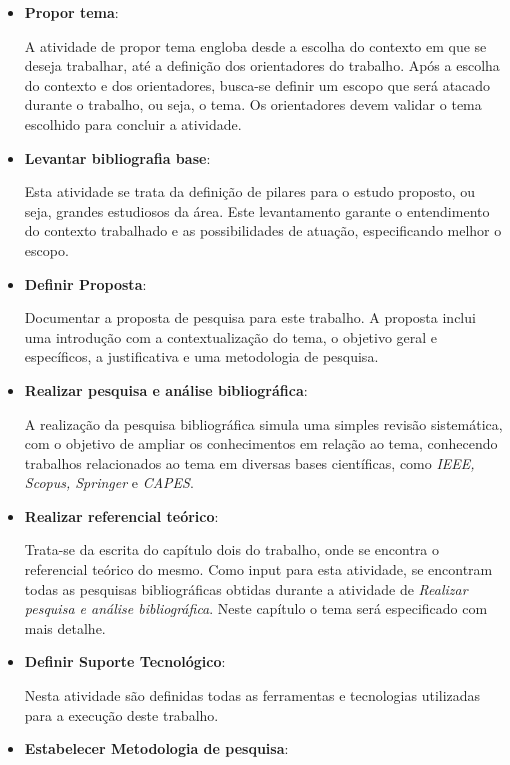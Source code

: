 \begin{itemize}
	\item \textbf{Propor tema}:

		A atividade de propor tema engloba desde a escolha do contexto em que se deseja trabalhar, até a definição dos orientadores do trabalho. Após a escolha do contexto e dos orientadores, busca-se definir um escopo que será atacado durante o trabalho, ou seja, o tema. Os orientadores devem validar o tema escolhido para concluir a atividade.

	\item \textbf{Levantar bibliografia base}:

		Esta atividade se trata da definição de pilares para o estudo proposto, ou seja, grandes estudiosos da área. Este levantamento garante o entendimento do contexto trabalhado e as possibilidades de atuação, especificando melhor o escopo.

	\item \textbf{Definir Proposta}:

		Documentar a proposta de pesquisa para este trabalho. A proposta inclui uma introdução com a contextualização do tema, o objetivo geral e específicos, a justificativa e uma metodologia de pesquisa.

	\item \textbf{Realizar pesquisa e análise bibliográfica}:

		A realização da pesquisa bibliográfica simula uma simples revisão sistemática, com o objetivo de ampliar os conhecimentos em relação ao tema, conhecendo trabalhos relacionados ao tema em diversas bases científicas, como \textit{IEEE, Scopus, Springer} e \textit{CAPES}.

	\item \textbf{Realizar referencial teórico}:

		Trata-se da escrita do capítulo dois do trabalho, onde se encontra o referencial teórico do mesmo. Como input para esta atividade, se encontram todas as pesquisas bibliográficas obtidas durante a atividade de \textit{Realizar pesquisa e análise bibliográfica}. Neste capítulo o tema será especificado com mais detalhe.

	\item \textbf{Definir Suporte Tecnológico}:

		Nesta atividade são definidas todas as ferramentas e tecnologias utilizadas para a execução deste trabalho. 

	\item \textbf{Estabelecer Metodologia de pesquisa}:


\end{itemize}
